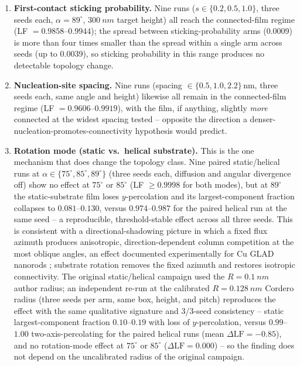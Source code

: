 \documentclass[aip,amsmath,amssymb,reprint]{revtex4-1}
\newcommand{\dang}{\ensuremath{\alpha}}
\begin{document}
\begin{enumerate}
  \item \textbf{First-contact sticking probability.} Nine runs
    ($s\in\{0.2,0.5,1.0\}$, three seeds each, $\dang=89^{\circ}$,
    $\SI{300}{nm}$ target height) all reach the connected-film regime
    (LF $=0.9858$--$0.9944$); the spread between sticking-probability
    arms (0.0009) is more than four times smaller than the spread within
    a single arm across seeds (up to 0.0039), so sticking probability in
    this range produces no detectable topology change.
  \item \textbf{Nucleation-site spacing.} Nine runs (spacing
    $\in\{0.5,1.0,2.2\}\,\mathrm{nm}$, three seeds each, same angle and
    height) likewise all remain in the connected-film regime (LF
    $=0.9606$--$0.9919$), with the film, if anything, slightly \emph{more}
    connected at the widest spacing tested -- opposite the direction a
    denser-nucleation-promotes-connectivity hypothesis would predict.
  \item \textbf{Rotation mode (static vs.\ helical substrate).} This is
    the one mechanism that does change the topology class. Nine paired
    static/helical runs at $\dang\in\{75^{\circ},85^{\circ},89^{\circ}\}$
    (three seeds each, diffusion and angular divergence off) show no
    effect at $75^{\circ}$ or $85^{\circ}$ (LF $\geq0.9998$ for both
    modes), but at $89^{\circ}$ the static-substrate film loses
    $y$-percolation and its largest-component fraction collapses to
    $0.081$--$0.130$, versus $0.974$--$0.987$ for the paired helical run
    at the same seed -- a reproducible, threshold-stable effect across
    all three seeds. This is consistent with a directional-shadowing
    picture in which a fixed flux azimuth produces anisotropic,
    direction-dependent column competition at the most oblique angles,
    an effect documented experimentally for Cu GLAD nanorods
    \citep{kesapragada2006}; substrate rotation removes the fixed
    azimuth and restores isotropic connectivity. The original static/helical campaign used the
    $R=\SI{0.1}{nm}$ author radius; an independent re-run at the
    calibrated $R=\SI{0.128}{nm}$ Cordero radius (three seeds per arm,
    same box, height, and pitch) reproduces the effect with the same
    qualitative signature and 3/3-seed consistency -- static
    largest-component fraction $0.10$--$0.19$ with loss of
    $y$-percolation, versus $0.99$--$1.00$ two-axis-percolating for the
    paired helical runs (mean $\Delta\mathrm{LF}=-0.85$), and no
    rotation-mode effect at $75^{\circ}$ or $85^{\circ}$
    ($\Delta\mathrm{LF}=0.000$) -- so the finding does not depend on the
    uncalibrated radius of the original campaign.
\end{enumerate}
\end{document}
